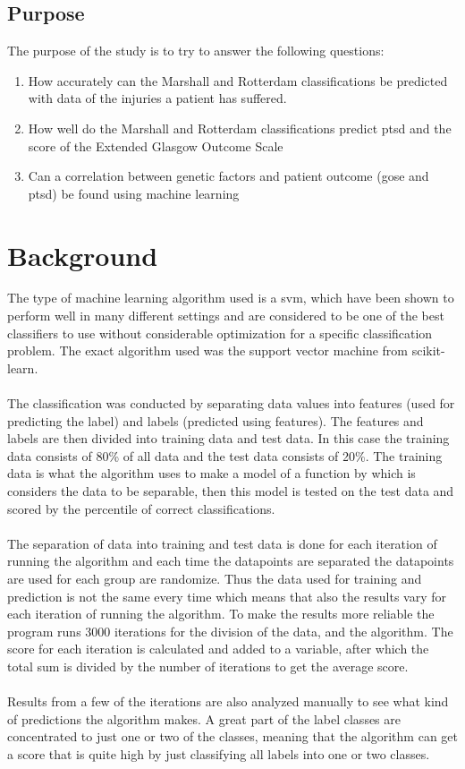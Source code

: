 \documentclass[11pt]{article}
\begin{document}
\subsection*{Purpose}
The purpose of the study is to try to answer the following questions:

\begin{enumerate}
  \item{How accurately can the Marshall and Rotterdam classifications be predicted with data of the injuries a patient has suffered.}
  \item{How well do the Marshall and Rotterdam classifications predict \gls{ptsd} and the score of the Extended Glasgow Outcome Scale}
  \item{Can a correlation between genetic factors and patient outcome (\gls{gose} and \gls{ptsd}) be found using machine learning}
\end{enumerate}

\section{Background}
The type of machine learning algorithm used is a \gls{svm}, which have been shown to perform well in many different settings and are considered to be one of the best classifiers to use without considerable optimization for a specific classification problem. The exact algorithm used was the support vector machine from scikit-learn\cite{SklearnSvmSVC}\cite{pedregosaScikitlearnMachineLearning2011}.\\
\\
The classification was conducted by separating data values into features (used for predicting the label) and labels (predicted using features). The features and labels are then divided into training data and test data. In this case the training data consists of 80\% of all data and the test data consists of 20\%. The training data is what the algorithm uses to make a model of a function by which is considers the data to be separable, then this model is tested on the test data and scored by the percentile of correct  classifications.\\
\\
The separation of data into training and test data is done for each iteration of running the algorithm and each time the datapoints are separated the datapoints are used for each group are randomize. Thus the data used for training and prediction is not the same every time which means that also the results vary for each iteration of running the algorithm. To make the results more reliable the program runs 3000 iterations for the division of the data, and the algorithm. The score for each iteration is calculated and added to a variable, after which the total sum is divided by the number of iterations to get the average score.\\
\\
Results from a few of the iterations are also analyzed manually to see what kind of predictions the algorithm makes. A great part of the label classes are concentrated to just one or two of the classes, meaning that the algorithm can get a score that is quite high by just classifying all labels into one or two classes.
\end{document}
